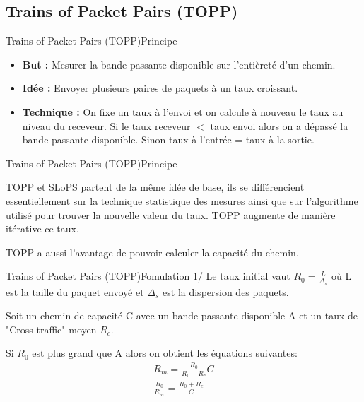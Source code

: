 \documentclass[compress]{beamer}
\begin{document}
\subsection{Trains of Packet Pairs (TOPP)}
\begin{frame}{Trains of Packet Pairs (TOPP)}{Principe}
\begin{itemize}
\item \textbf{But :}  Mesurer la {\color{red}bande passante disponible} sur l'entièreté d'un chemin.
\pause
\item \textbf{Idée :}  Envoyer plusieurs paires de paquets à un taux
croissant.
\pause
\item \textbf{Technique :} On fixe un taux à l'envoi et on calcule à
nouveau le taux au niveau du receveur. Si le taux receveur $<$ taux envoi alors on a dépassé la bande passante disponible.
Sinon taux à l'entrée = taux à la sortie.
\end{itemize}
\end{frame}
\begin{frame}{Trains of Packet Pairs (TOPP)}{Principe}

TOPP et SLoPS partent de la même idée de base, ils se différencient
essentiellement sur la technique statistique des mesures ainsi que sur
l'algorithme utilisé pour trouver la nouvelle valeur du taux.
TOPP augmente de manière itérative ce taux.

TOPP a aussi l'avantage de pouvoir calculer la capacité du chemin.

\end{frame}
\begin{frame}{Trains of Packet Pairs (TOPP)}{Fomulation 1/}
Le taux initial vaut
$R_0 = \frac{L}{\Delta_s}$ où L est la taille du paquet envoyé et $\Delta_s$ est la dispersion des paquets.

Soit un chemin de capacité C avec un bande passante disponible A et
un taux de "Cross traffic" moyen $R_c$.

Si $R_0$ est plus grand que A alors on obtient les équations suivantes:
\begin{align}
R_m = \frac{R_0}{R_0 + R_c}C \\
\frac{R_0}{R_m} = \frac{R_0 + R_c}{C}
\label{capa}
\end{align}
\end{frame}
\end{document}
